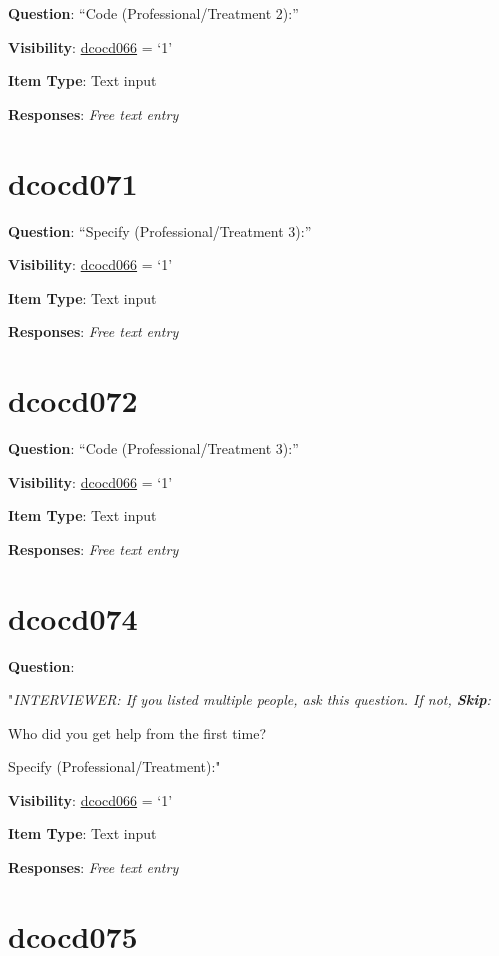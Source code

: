 \documentclass[]{book}
\begin{document}
\textbf{Question}: ``Code (Professional/Treatment 2):''

\textbf{Visibility}: \protect\hyperlink{dcocd066}{dcocd066} = `1'

\textbf{Item Type}: Text input

\textbf{Responses}: \emph{Free text entry}

\hypertarget{dcocd071}{%
\section{dcocd071}\label{dcocd071}}

\textbf{Question}: ``Specify (Professional/Treatment 3):''

\textbf{Visibility}: \protect\hyperlink{dcocd066}{dcocd066} = `1'

\textbf{Item Type}: Text input

\textbf{Responses}: \emph{Free text entry}

\hypertarget{dcocd072}{%
\section{dcocd072}\label{dcocd072}}

\textbf{Question}: ``Code (Professional/Treatment 3):''

\textbf{Visibility}: \protect\hyperlink{dcocd066}{dcocd066} = `1'

\textbf{Item Type}: Text input

\textbf{Responses}: \emph{Free text entry}

\hypertarget{dcocd074}{%
\section{dcocd074}\label{dcocd074}}

\textbf{Question}:

"\emph{INTERVIEWER: If you listed multiple people, ask this question. If not, \textbf{Skip}:}

Who did you get help from the first time?

Specify (Professional/Treatment):"

\textbf{Visibility}: \protect\hyperlink{dcocd066}{dcocd066} = `1'

\textbf{Item Type}: Text input

\textbf{Responses}: \emph{Free text entry}

\hypertarget{dcocd075}{%
\section{dcocd075}\label{dcocd075}}
\end{document}
